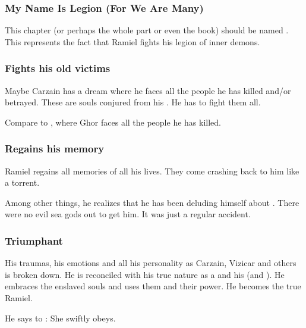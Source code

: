 \subsubsection{My Name Is Legion (For We Are Many)}
This chapter (or perhaps the whole part or even the book) should be named . 
This represents the fact that Ramiel fights his legion of inner demons.





\subsubsection{Fights his old victims}
Maybe Carzain has a dream where he faces all the people he has killed and/or betrayed. 
These are souls conjured from his \carcer.
He has to fight them all. 

Compare to \cite[p.85--86]{RobertEHoward:Ghor}, where Ghor faces all the people he has killed. 





\subsubsection{Regains his memory}
Ramiel regains all memories of all his lives. 
They come crashing back to him like a torrent. 

Among other things, he realizes that he has been deluding himself about . 
There were no evil sea gods out to get him. 
It was just a regular accident. 





\subsubsection{Triumphant}
His traumas, his emotions and all his personality as Carzain, Vizicar and others is broken down. 
He is reconciled with his true nature as a \sathariah{} and his \malach{}  (and ).  
He embraces the enslaved souls and uses them and their power. 
He becomes the true Ramiel. 

He says to \Cishiel:
She swiftly obeys. 


